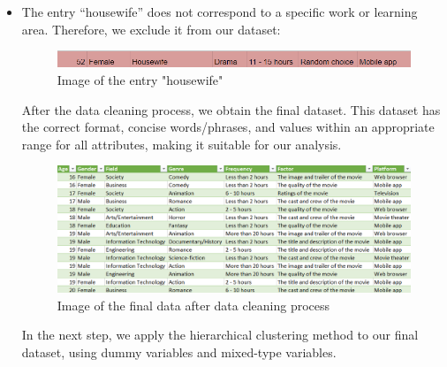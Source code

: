 \begin{itemize}
                    \item The entry “housewife” does not correspond to a specific work or learning area. Therefore, we exclude it from our dataset:
                        \begin{figure}[H]
                            \centering
                            \includegraphics[scale=0.75]{graphics/data/housewife.png}
                            \caption{Image of the entry "housewife"}
                        \end{figure} 
                    After the data cleaning process, we obtain the final dataset. This dataset has the correct format, concise words/phrases, and values within an appropriate range for all attributes, making it suitable for our analysis.
                    \begin{figure}[H]
                        \centering
                        \includegraphics[scale=0.65]{graphics/data/finaldata.png}
                        \caption{Image of the final data after data cleaning process}
                    \end{figure} 
            In the next step, we apply the hierarchical clustering method to our final dataset, using dummy variables and mixed-type variables.
                \end{itemize}